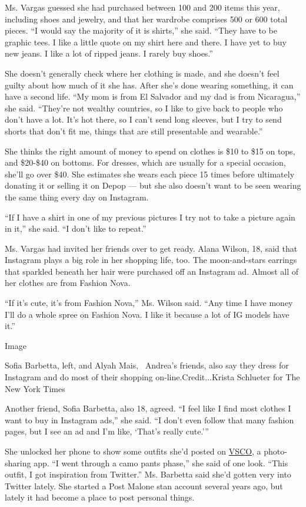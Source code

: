 Ms. Vargas guessed she had purchased between 100 and 200 items this
year, including shoes and jewelry, and that her wardrobe comprises 500
or 600 total pieces. ``I would say the majority of it is shirts,'' she
said. ``They have to be graphic tees. I like a little quote on my shirt
here and there. I have yet to buy new jeans. I like a lot of ripped
jeans. I rarely buy shoes.''

She doesn't generally check where her clothing is made, and she doesn't
feel guilty about how much of it she has. After she's done wearing
something, it can have a second life. ``My mom is from El Salvador and
my dad is from Nicaragua,'' she said. ``They're not wealthy countries,
so I like to give back to people who don't have a lot. It's hot there,
so I can't send long sleeves, but I try to send shorts that don't fit
me, things that are still presentable and wearable.''

She thinks the right amount of money to spend on clothes is \$10 to \$15
on tops, and \$20-\$40 on bottoms. For dresses, which are usually for a
special occasion, she'll go over \$40. She estimates she wears each
piece 15 times before ultimately donating it or selling it on Depop ---
but she also doesn't want to be seen wearing the same thing every day on
Instagram.

``If I have a shirt in one of my previous pictures I try not to take a
picture again in it,'' she said. ``I don't like to repeat.''

Ms. Vargas had invited her friends over to get ready. Alana Wilson, 18,
said that Instagram plays a big role in her shopping life, too. The
moon-and-stars earrings that sparkled beneath her hair were purchased
off an Instagram ad. Almost all of her clothes are from Fashion Nova.

``If it's cute, it's from Fashion Nova,'' Ms. Wilson said. ``Any time I
have money I'll do a whole spree on Fashion Nova. I like it because a
lot of IG models have it.''

Image

Sofia Barbetta, left, and Alyah Mais,~ Andrea's friends, also say they
dress for Instagram and do most of their shopping
on-line.Credit...Krista Schlueter for The New York Times

Another friend, Sofia Barbetta, also 18, agreed. ``I feel like I find
most clothes I want to buy in Instagram ads,'' she said. ``I don't even
follow that many fashion pages, but I see an ad and I'm like, `That's
really cute.'''

She unlocked her phone to show some outfits she'd posted on
\href{https://www.nytimes.com/2019/08/30/style/vsco-girls.html}{VSCO}, a
photo-sharing app. ``I went through a camo pants phase,'' she said of
one look. ``This outfit, I got inspiration from Twitter.'' Ms. Barbetta
said she'd gotten very into Twitter lately. She started a Post Malone
stan account several years ago, but lately it had become a place to post
personal things.

